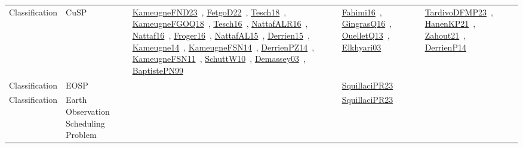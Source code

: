 {\begin{longtable}{lp{3cm}>{\raggedright\arraybackslash}p{6cm}>{\raggedright\arraybackslash}p{6cm}>{\raggedright\arraybackslash}p{8cm}}
Classification & CuSP & \href{../works/KameugneFND23.pdf}{KameugneFND23}~\cite{KameugneFND23}, \href{../works/FetgoD22.pdf}{FetgoD22}~\cite{FetgoD22}, \href{../works/Tesch18.pdf}{Tesch18}~\cite{Tesch18}, \href{../works/KameugneFGOQ18.pdf}{KameugneFGOQ18}~\cite{KameugneFGOQ18}, \href{../works/Tesch16.pdf}{Tesch16}~\cite{Tesch16}, \href{../works/NattafALR16.pdf}{NattafALR16}~\cite{NattafALR16}, \href{../works/Nattaf16.pdf}{Nattaf16}~\cite{Nattaf16}, \href{../works/Froger16.pdf}{Froger16}~\cite{Froger16}, \href{../works/NattafAL15.pdf}{NattafAL15}~\cite{NattafAL15}, \href{../works/Derrien15.pdf}{Derrien15}~\cite{Derrien15}, \href{../works/Kameugne14.pdf}{Kameugne14}~\cite{Kameugne14}, \href{../works/KameugneFSN14.pdf}{KameugneFSN14}~\cite{KameugneFSN14}, \href{../works/DerrienPZ14.pdf}{DerrienPZ14}~\cite{DerrienPZ14}, \href{../works/KameugneFSN11.pdf}{KameugneFSN11}~\cite{KameugneFSN11}, \href{../works/SchuttW10.pdf}{SchuttW10}~\cite{SchuttW10}, \href{../works/Demassey03.pdf}{Demassey03}~\cite{Demassey03}, \href{../works/BaptistePN99.pdf}{BaptistePN99}~\cite{BaptistePN99} & \href{../works/Fahimi16.pdf}{Fahimi16}~\cite{Fahimi16}, \href{../works/GingrasQ16.pdf}{GingrasQ16}~\cite{GingrasQ16}, \href{../works/OuelletQ13.pdf}{OuelletQ13}~\cite{OuelletQ13}, \href{../works/Elkhyari03.pdf}{Elkhyari03}~\cite{Elkhyari03} & \href{../works/TardivoDFMP23.pdf}{TardivoDFMP23}~\cite{TardivoDFMP23}, \href{../works/HanenKP21.pdf}{HanenKP21}~\cite{HanenKP21}, \href{../works/Zahout21.pdf}{Zahout21}~\cite{Zahout21}, \href{../works/DerrienP14.pdf}{DerrienP14}~\cite{DerrienP14}\\
Classification & EOSP &  & \href{../works/SquillaciPR23.pdf}{SquillaciPR23}~\cite{SquillaciPR23} & \\
Classification & Earth Observation Scheduling Problem &  & \href{../works/SquillaciPR23.pdf}{SquillaciPR23}~\cite{SquillaciPR23} & \\

\end{longtable}}
